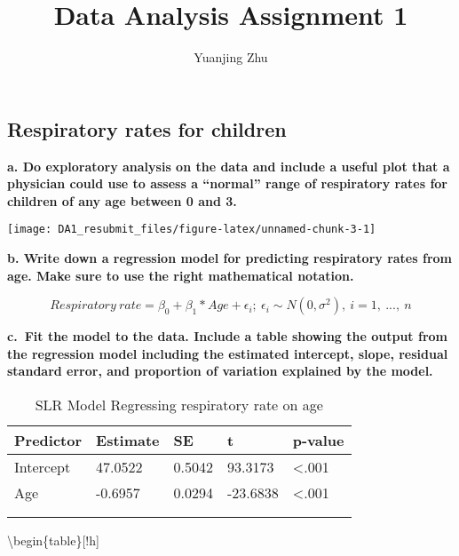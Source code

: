 \documentclass[
]{article}
\title{Data Analysis Assignment 1}
\author{Yuanjing Zhu}
\date{}
\begin{document}
\maketitle

\hypertarget{respiratory-rates-for-children}{%
\subsection{Respiratory rates for
children}\label{respiratory-rates-for-children}}

\textbf{a. Do exploratory analysis on the data and include a useful plot
that a physician could use to assess a ``normal'' range of respiratory
rates for children of any age between 0 and 3.}

\begin{center}\texttt{[image: DA1\_resubmit\_files/figure-latex/unnamed-chunk-3-1]} \end{center}

\textbf{b. Write down a regression model for predicting respiratory
rates from age. Make sure to use the right mathematical notation.}

\[
Respiratory~rate = \beta_0 + \beta_1 * Age + \epsilon_i; ~ \epsilon_i\sim N(0, \sigma^2),~i = 1,~...,~n
\]

\textbf{c.~Fit the model to the data. Include a table showing the output
from the regression model including the estimated intercept, slope,
residual standard error, and proportion of variation explained by the
model.}

\begin{table}[!h]

\caption{\label{tab:unnamed-chunk-4}SLR Model Regressing respiratory rate on age}
\centering
\begin{tabu} to 
\hline
Predictor & Estimate & SE & t & p-value\\
\hline
Intercept & 47.0522 & 0.5042 & 93.3173 & <.001\\
\hline
Age & -0.6957 & 0.0294 & -23.6838 & <.001\\
\hline
{}\\
\\
\end{tabu}
\end{table}

\textbackslash begin\{table\}{[}!h{]}
\end{document}

